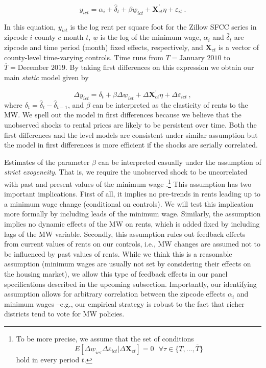 \begin{equation*} \label{eq:did_lev}
    y_{ict} = \alpha_i + \hat{\delta}_t 
    		+ \beta \underline{w}_{ict} 
    		+ \mathbf{X}^{'}_{ct}\eta 
    		+ \varepsilon_{it} \ .
\end{equation*}    

In this equation, $y_{ict}$ is the log rent per square foot for the Zillow SFCC series in 
zipcode $i$ county $c$ month $t$, $\underline{w}$ is the log of the minimum wage, $\alpha_i$ 
and $\hat{\delta}_t$ are zipcode and time period (month) fixed effects, respectively, and 
$\mathbf{X}_{ct}$ is a vector of county-level time-varying controls. Time runs from 
$\underline{T} = \text{January 2010}$ to $\overline{T} = \text{December 2019}$. By taking 
first differences on this expression we obtain our main \textit{static} model given by
    
\begin{equation}\label{eq:did}
	\Delta y_{ict} = \delta_t
				   + \beta \Delta \underline{w}_{ict}
				   + \Delta \mathbf{X}^{'}_{ct} \eta
				   + \Delta \varepsilon_{ict} \ ,
\end{equation}
where $\delta_t = \hat{\delta}_t - \hat{\delta}_{t-1}$, and $\beta$ can be interpreted 
as the elasticity of rents to the MW. We spell out the model in first differences because 
we believe that the unobserved shocks to rental prices are likely to be persistent over 
time. Both the first differences and the level models are consistent under similar assumption 
but the model in first differences is more efficient if the shocks are serially correlated.

Estimates of the parameter $\beta$ can be interpreted casually under the assumption of
\textit{strict exogeneity}. That is, we require the unobserved shock to be uncorrelated
with past and present values of the minimum wage \parencite[][chapter 10]
{wooldridge2010}.\footnote{To be more precise, we assume that the set of conditions 
	$$E[\Delta \underline{w}_{ic\tau} \Delta \varepsilon_{ict} | \Delta \mathbf{X}_{ct}] = 0
	\ \ \ \forall \tau \in \{\underline{T}, ..., \overline{T}\}$$
	hold in every period $t$.}
This assumption has two important implications. First of all, it implies no pre-trends in 
rents leading up to a minimum wage change (conditional on controls). We will test this 
implication more formally by including leads of the minimum wage. Similarly, the assumption 
implies no dynamic effects of the MW on rents, which is added fixed by including lags of the 
MW variable. Secondly, this assumption rules out feedback effects from current values of rents 
on our controls, i.e., MW changes are assumed not to be influenced by past values of rents. 
While we think this is a reasonable assumption (minimum wages are usually not set by considering 
their effects on the housing market), we allow this type of feedback effects in our panel 
specifications described in the upcoming subsection. Importantly, our identifying assumption 
allows for arbitrary correlation between the zipcode effects $\alpha_i$ and minimum wages 
--e.g., our empirical strategy is robust to the fact that richer districts tend to vote for 
MW policies.

